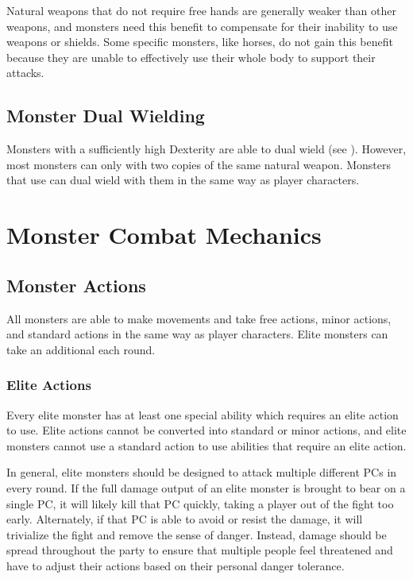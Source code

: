         Natural weapons that do not require free hands are generally weaker than other weapons, and monsters need this benefit to compensate for their inability to use weapons or shields.
        Some specific monsters, like horses, do not gain this benefit because they are unable to effectively use their whole body to support their attacks.

    \subsection{Monster Dual Wielding}\label{Monster Dual Wielding}
        Monsters with a sufficiently high Dexterity are able to dual wield (see ).
        However, most monsters can only  with two copies of the same  natural weapon.
        Monsters that use  can dual wield with them in the same way as player characters.

\section{Monster Combat Mechanics}

    \subsection{Monster Actions}\label{Monster Actions}
        All monsters are able to make movements and take free actions, minor actions, and standard actions in the same way as player characters.
        Elite monsters can take an additional  each round.

        \subsubsection{Elite Actions}\label{Elite Actions}
            Every elite monster has at least one special ability which requires an elite action to use.
            Elite actions cannot be converted into standard or minor actions, and elite monsters cannot use a standard action to use abilities that require an elite action.

            In general, elite monsters should be designed to attack multiple different PCs in every round.
            If the full damage output of an elite monster is brought to bear on a single PC, it will likely kill that PC quickly, taking a player out of the fight too early.
            Alternately, if that PC is able to avoid or resist the damage, it will trivialize the fight and remove the sense of danger.
            Instead, damage should be spread throughout the party to ensure that multiple people feel threatened and have to adjust their actions based on their personal danger tolerance.

